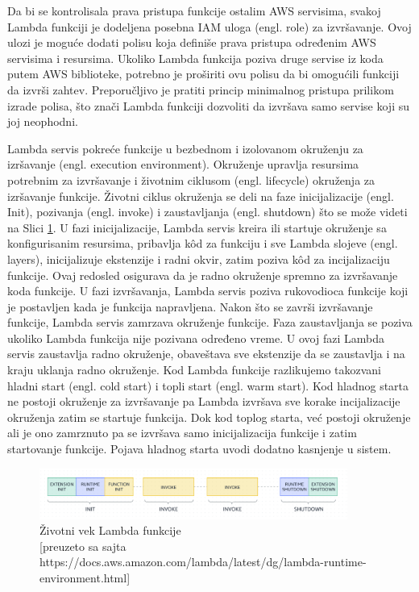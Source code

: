 \documentclass[12pt,oneside]{memoir}
\begin{document}
 
Da bi se kontrolisala prava pristupa funkcije ostalim AWS servisima, svakoj Lambda funkciji je dodeljena posebna IAM uloga (engl. role) za izvršavanje. Ovoj ulozi je moguće dodati polisu koja definiše prava pristupa određenim AWS servisima i resursima. Ukoliko Lambda funkcija poziva druge servise iz koda putem AWS biblioteke, potrebno je proširiti ovu polisu da bi omogućili funkciji da izvrši zahtev. Preporučljivo je pratiti princip minimalnog pristupa prilikom izrade polisa, što znači Lambda funkciji dozvoliti da izvršava samo servise koji su joj neophodni. 

 
Lambda servis pokreće funkcije u bezbednom i izolovanom okruženju za izršavanje (engl. execution environment). Okruženje upravlja resursima potrebnim za izvršavanje i životnim ciklusom (engl. lifecycle) okruženja za izršavanje funkcije. Životni ciklus okruženja se deli na faze inicijalizacije (engl. Init), pozivanja (engl. invoke) i zaustavljanja (engl. shutdown) što se može videti na Slici \ref{fig:awsLambdaZivotniVek}. U fazi inicijalizacije, Lambda servis kreira ili startuje okruženje sa konfigurisanim resursima, pribavlja kôd za funkciju i sve Lambda slojeve (engl. layers), inicijalizuje ekstenzije i radni okvir, zatim poziva kôd za incijalizaciju funkcije. Ovaj redosled osigurava da je radno okruženje spremno za izvršavanje koda funkcije. U fazi izvršavanja, Lambda servis poziva rukovodioca funkcije koji je postavljen kada je funkcija napravljena. Nakon što se završi izvršavanje funkcije, Lambda servis zamrzava okruženje funkcije. Faza zaustavljanja se poziva ukoliko Lambda funkcija nije pozivana određeno vreme. U ovoj fazi Lambda servis zaustavlja radno okruženje, obaveštava sve ekstenzije da se zaustavlja i na kraju uklanja radno okruženje. Kod Lambda funkcije razlikujemo takozvani hladni start (engl. cold start) i topli start (engl. warm start). Kod hladnog starta ne postoji okruženje za izvršavanje pa Lambda izvršava sve korake incijalizacije okruženja zatim se startuje funkcija. Dok kod toplog starta, već postoji okruženje ali je ono zamrznuto pa se izvršava samo inicijalizacija funkcije i zatim startovanje funkcije. Pojava hladnog starta uvodi dodatno kasnjenje u sistem. 
 

\begin{figure}[!ht]
  \centering
  \includegraphics[width=0.9\textwidth]{AWS-Lambda-zivotnivek.png}
  \caption{Životni vek Lambda funkcije\\\footnotesize[preuzeto sa sajta https://docs.aws.amazon.com/lambda/latest/dg/lambda-runtime-environment.html]}
  \label{fig:awsLambdaZivotniVek}
\end{figure}
 
\end{document}
